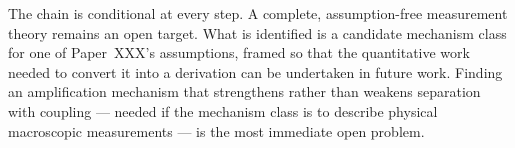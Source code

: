 \documentclass[12pt]{article}
\begin{document}
The chain is conditional at every step. A complete, assumption-free measurement theory remains an open target. What is identified is a candidate mechanism class for one of Paper~XXX's assumptions, framed so that the quantitative work needed to convert it into a derivation can be undertaken in future work. Finding an amplification mechanism that strengthens rather than weakens separation with coupling --- needed if the mechanism class is to describe physical macroscopic measurements --- is the most immediate open problem.



\end{document}
